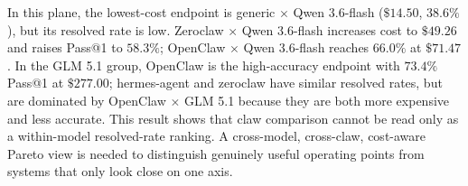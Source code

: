 In this plane, the lowest-cost endpoint is generic $\times$ Qwen 3.6-flash ($\$14.50$, $38.6\%$), but its resolved rate is low. Zeroclaw $\times$ Qwen 3.6-flash increases cost to $\$49.26$ and raises Pass@1 to $58.3\%$; OpenClaw $\times$ Qwen 3.6-flash reaches $66.0\%$ at $\$71.47$. In the GLM 5.1 group, OpenClaw is the high-accuracy endpoint with $73.4\%$ Pass@1 at $\$277.00$; hermes-agent and zeroclaw have similar resolved rates, but are dominated by OpenClaw $\times$ GLM 5.1 because they are both more expensive and less accurate. This result shows that claw comparison cannot be read only as a within-model resolved-rate ranking. A cross-model, cross-claw, cost-aware Pareto view is needed to distinguish genuinely useful operating points from systems that only look close on one axis.





